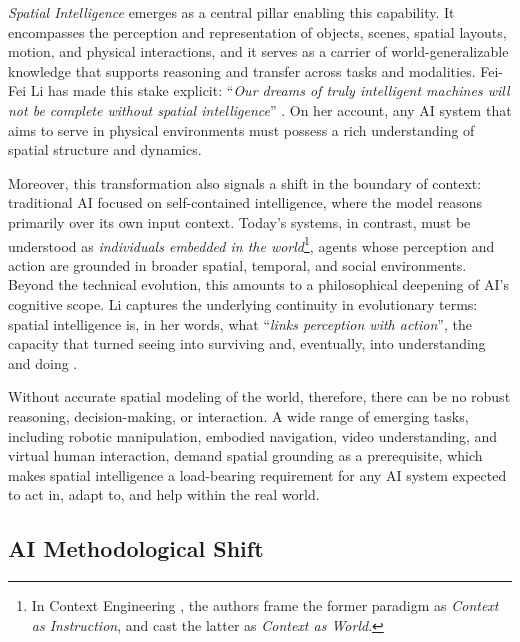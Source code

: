 \emph{Spatial Intelligence} emerges as a central pillar enabling this capability.
It encompasses the perception and representation of objects, scenes, spatial layouts, motion, and physical interactions, and it serves as a carrier of world-generalizable knowledge that supports reasoning and transfer across tasks and modalities.
Fei-Fei Li has made this stake explicit: ``\emph{Our dreams of truly intelligent machines will not be complete without spatial intelligence}'' \cite{Feifei2025spatial}.
On her account, any AI system that aims to serve in physical environments must possess a rich understanding of spatial structure and dynamics.



Moreover, this transformation also signals a shift in the boundary of context: traditional AI focused on self-contained intelligence, where the model reasons primarily over its own input context.
Today's systems, in contrast, must be understood as \emph{individuals embedded in the world}\footnote{In Context Engineering \cite{hua2025context}, the authors frame the former paradigm as \emph{Context as Instruction}, and cast the latter as \emph{Context as World}.}, agents whose perception and action are grounded in broader spatial, temporal, and social environments.
Beyond the technical evolution, this amounts to a philosophical deepening of AI's cognitive scope.
Li captures the underlying continuity in evolutionary terms: spatial intelligence is, in her words, what ``\emph{links perception with action}'', the capacity that turned seeing into surviving and, eventually, into understanding and doing \cite{Feifei2024ted}.



Without accurate spatial modeling of the world, therefore, there can be no robust reasoning, decision-making, or interaction.
A wide range of emerging tasks, including robotic manipulation, embodied navigation, video understanding, and virtual human interaction, demand spatial grounding as a prerequisite, which makes spatial intelligence a load-bearing requirement for any AI system expected to act in, adapt to, and help within the real world.







\subsection{AI Methodological Shift}
\label{subsec:ai-methodological-shift}

